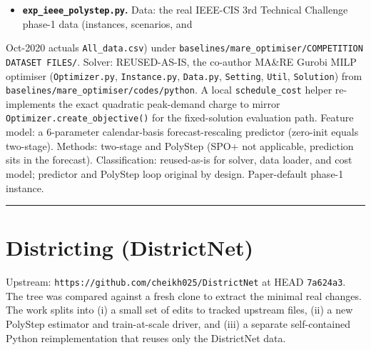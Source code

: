 \documentclass[10pt]{article}
\begin{document}
\begin{itemize}\setlength{\itemsep}{2pt}
\item \textbf{\texttt{exp\_ieee\_polystep.py}.} Data: the real IEEE-CIS 3rd Technical Challenge phase-1 data (instances, scenarios, and
\end{itemize}
  Oct-2020 actuals \texttt{All\_data.csv}) under \texttt{baselines/mare\_optimiser/COMPETITION DATASET FILES/}. Solver: REUSED-AS-IS,
  the co-author MA\&RE Gurobi MILP optimiser (\texttt{Optimizer.py}, \texttt{Instance.py}, \texttt{Data.py}, \texttt{Setting}, \texttt{Util}, \texttt{Solution})
  from \texttt{baselines/mare\_optimiser/codes/python}. A local \texttt{schedule\_cost} helper re-implements the exact quadratic
  peak-demand charge to mirror \texttt{Optimizer.create\_objective()} for the fixed-solution evaluation path. Feature model: a
  6-parameter calendar-basis forecast-rescaling predictor (zero-init equals two-stage). Methods: two-stage and PolyStep
  (SPO+ not applicable, prediction sits in the forecast). Classification: reused-as-is for solver, data loader, and cost
  model; predictor and PolyStep loop original by design. Paper-default phase-1 instance.

\medskip\hrule\medskip

\section*{Districting (DistrictNet)}

Upstream: \texttt{https://github.com/cheikh025/DistrictNet} at HEAD \texttt{7a624a3}. The tree was compared against a fresh clone to
extract the minimal real changes. The work splits into (i) a small set of edits to tracked upstream files, (ii) a new
PolyStep estimator and train-at-scale driver, and (iii) a separate self-contained Python reimplementation that reuses
only the DistrictNet data.
\end{document}
